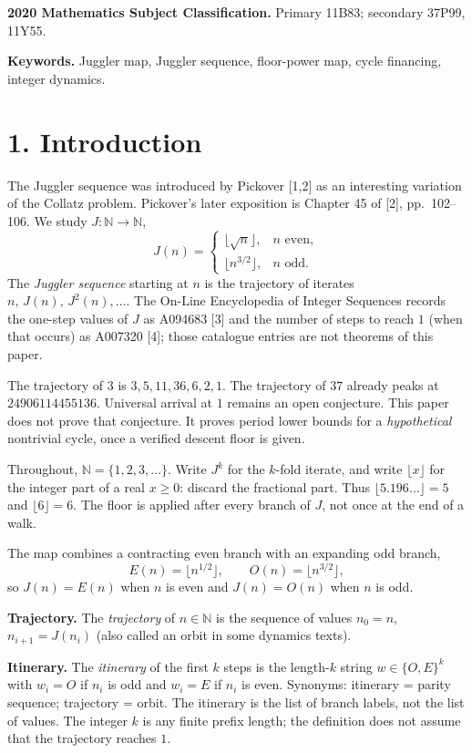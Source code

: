 \documentclass[12pt]{article}
\begin{document}
\textbf{2020 Mathematics Subject Classification.} Primary 11B83;
secondary 37P99, 11Y55.

\textbf{Keywords.} Juggler map, Juggler sequence, floor-power map, cycle
financing, integer dynamics.

\section{1. Introduction}\label{introduction}

The Juggler sequence was introduced by Pickover {[}1,2{]} as an
interesting variation of the Collatz problem. Pickover's later
exposition is Chapter 45 of {[}2{]}, pp.~102--106. We study
\(J:\mathbb N\to\mathbb N\), \[
J(n)=\begin{cases}
\lfloor\sqrt n\rfloor,&n\text{ even},\\
\lfloor n^{3/2}\rfloor,&n\text{ odd}.
\end{cases}
\] The \emph{Juggler sequence} starting at \(n\) is the trajectory of
iterates \(n,\,J(n),\,J^2(n),\ldots\). The On-Line Encyclopedia of
Integer Sequences records the one-step values of \(J\) as A094683
{[}3{]} and the number of steps to reach \(1\) (when that occurs) as
A007320 {[}4{]}; those catalogue entries are not theorems of this paper.

The trajectory of \(3\) is \(3,5,11,36,6,2,1\). The trajectory of \(37\)
already peaks at \(24906114455136\). Universal arrival at \(1\) remains
an open conjecture. This paper does not prove that conjecture. It proves
period lower bounds for a \emph{hypothetical} nontrivial cycle, once a
verified descent floor is given.

Throughout, \(\mathbb N=\{1,2,3,\ldots\}\). Write \(J^k\) for the
\(k\)-fold iterate, and write \(\lfloor x\rfloor\) for the integer part
of a real \(x\ge 0\): discard the fractional part. Thus
\(\lfloor 5.196\ldots\rfloor=5\) and \(\lfloor 6\rfloor=6\). The floor
is applied after every branch of \(J\), not once at the end of a walk.

The map combines a contracting even branch with an expanding odd branch,
\[
E(n)=\lfloor n^{1/2}\rfloor,\qquad
O(n)=\lfloor n^{3/2}\rfloor,
\] so \(J(n)=E(n)\) when \(n\) is even and \(J(n)=O(n)\) when \(n\) is
odd.

\textbf{Trajectory.} The \emph{trajectory} of \(n\in\mathbb N\) is the
sequence of values \(n_0=n\), \(n_{i+1}=J(n_i)\) (also called an orbit
in some dynamics texts).

\textbf{Itinerary.} The \emph{itinerary} of the first \(k\) steps is the
length-\(k\) string \(w\in\{O,E\}^k\) with \(w_i=O\) if \(n_i\) is odd
and \(w_i=E\) if \(n_i\) is even. Synonyms: itinerary = parity sequence;
trajectory = orbit. The itinerary is the list of branch labels, not the
list of values. The integer \(k\) is any finite prefix length; the
definition does not assume that the trajectory reaches \(1\).
\end{document}
